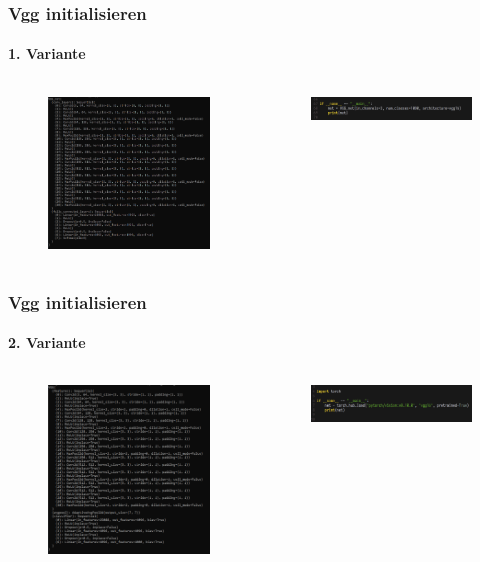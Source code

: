 \documentclass[10pt]{beamer}
\begin{document}
\begin{frame}
\frametitle{Vgg initialisieren}
\framesubtitle{1. Variante}
\begin{columns}
	\begin{column}{.5\textwidth}
		\begin{figure}
			\includegraphics[width=55mm]{init_output.png}
		\end{figure}
	\end{column}
	\begin{column}{.5\textwidth}
		\begin{figure}
			\includegraphics[width=55mm]{init_print.png}
		\end{figure}
	\end{column}
\end{columns}
\end{frame}

\begin{frame}
\frametitle{Vgg initialisieren}
\framesubtitle{2. Variante}
\begin{columns}
	\begin{column}{.5\textwidth}
		\begin{figure}
			\includegraphics[width=55mm]{load_output.png}
		\end{figure}
	\end{column}
	\begin{column}{.5\textwidth}
		\begin{figure}
			\includegraphics[width=55mm]{load.png}
		\end{figure}
	\end{column}
\end{columns}
\end{frame}
\end{document}
